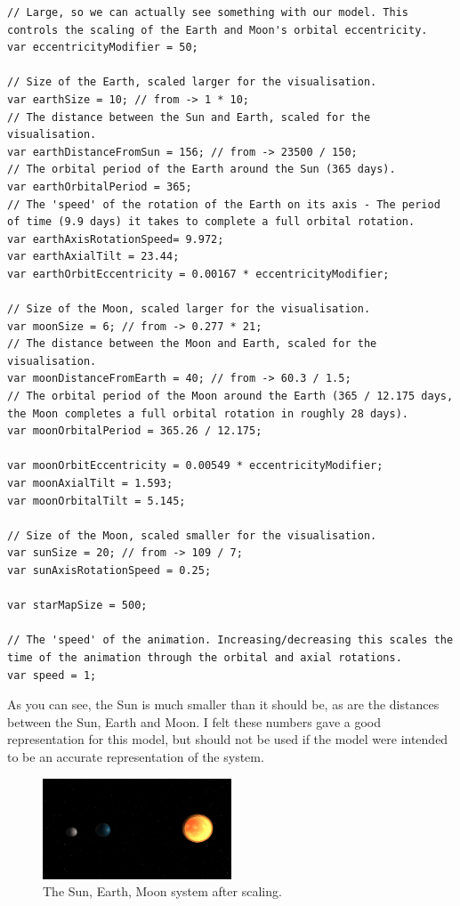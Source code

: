 \documentclass[12pt]{article}
\begin{document}
\begin{lstlisting}
// Large, so we can actually see something with our model. This controls the scaling of the Earth and Moon's orbital eccentricity.
var eccentricityModifier = 50;

// Size of the Earth, scaled larger for the visualisation.
var earthSize = 10; // from -> 1 * 10; 
// The distance between the Sun and Earth, scaled for the visualisation.
var earthDistanceFromSun = 156; // from -> 23500 / 150; 
// The orbital period of the Earth around the Sun (365 days).
var earthOrbitalPeriod = 365;
// The 'speed' of the rotation of the Earth on its axis - The period of time (9.9 days) it takes to complete a full orbital rotation.
var earthAxisRotationSpeed= 9.972; 
var earthAxialTilt = 23.44;
var earthOrbitEccentricity = 0.00167 * eccentricityModifier;

// Size of the Moon, scaled larger for the visualisation.
var moonSize = 6; // from -> 0.277 * 21;
// The distance between the Moon and Earth, scaled for the visualisation.
var moonDistanceFromEarth = 40; // from -> 60.3 / 1.5; 
// The orbital period of the Moon around the Earth (365 / 12.175 days, the Moon completes a full orbital rotation in roughly 28 days).
var moonOrbitalPeriod = 365.26 / 12.175;

var moonOrbitEccentricity = 0.00549 * eccentricityModifier;
var moonAxialTilt = 1.593;
var moonOrbitalTilt = 5.145;

// Size of the Moon, scaled smaller for the visualisation.
var sunSize = 20; // from -> 109 / 7;
var sunAxisRotationSpeed = 0.25;

var starMapSize = 500;

// The 'speed' of the animation. Increasing/decreasing this scales the time of the animation through the orbital and axial rotations.
var speed = 1;
\end{lstlisting}

As you can see, the Sun is much smaller than it should be, as are the distances between the Sun, Earth and Moon. I felt these numbers gave a good representation for this model, but should not be used if the model were intended to be an accurate representation of the system.

\begin{figure}[H]
        \centering
       
                \includegraphics[width=0.5\textwidth]{images/scales}
                \caption{ The Sun, Earth, Moon system after scaling.}
                \label{fig: The Sun, Earth, Moon system after scaling.}
      
\end{figure}
\end{document}

